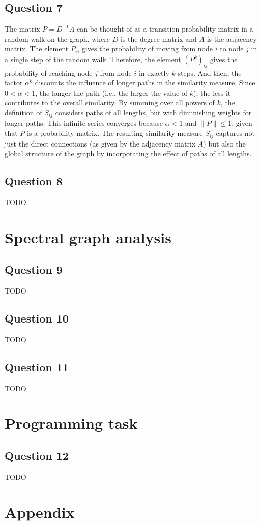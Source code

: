 \documentclass{article}
\begin{document}
\subsection{Question 7}
The matrix \( P = D^{-1}A \) can be thought of as a transition probability matrix in a random walk on the graph, where \( D \) is the degree matrix and \( A \) is the adjacency matrix. The element \( P_{ij} \) gives the probability of moving from node \( i \) to node \( j \) in a single step of the random walk.
Therefore, the element \( (P^k)_{ij} \) gives the probability of reaching node \( j \) from node \( i \) in exactly \( k \) steps.
And then, the factor \( \alpha^k \) discounts the influence of longer paths in the similarity measure. Since \( 0 < \alpha < 1 \), the longer the path (i.e., the larger the value of \( k \)), the less it contributes to the overall similarity.
By summing over all powers of \( k \), the definition of \( S_{ij} \) considers paths of all lengths, but with diminishing weights for longer paths. This infinite series converges because \( \alpha < 1 \) and \( \|P\| \leq 1 \), given that \( P \) is a probability matrix.
The resulting similarity measure \( S_{ij} \) captures not just the direct connections (as given by the adjacency matrix \( A \)) but also the global structure of the graph by incorporating the effect of paths of all lengths.

\subsection{Question 8}
TODO

\section{Spectral graph analysis}

\subsection{Question 9}
TODO

\subsection{Question 10}
TODO

\subsection{Question 11}
TODO

\section{Programming task}

\subsection{Question 12}
TODO

\newpage
\appendix

\section{Appendix}
\end{document}
